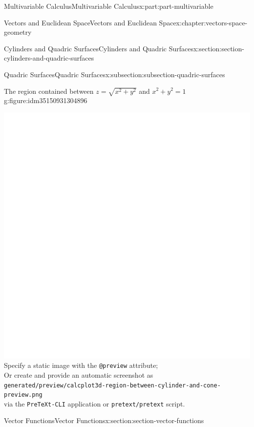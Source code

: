 \documentclass[twoside,10pt,]{tufte-book}
\newcommand{\mono}[1]{\texttt{#1}}
\numberwithin{equation}{part}
\newlength{\qrsize}
\newlength{\previewwidth}
\begin{document}
\begin{partptx}{Multivariable Calculus}{}{Multivariable Calculus}{}{}{x:part:part-multivariable}
\begin{chapterptx}{Vectors and Euclidean Space}{}{Vectors and Euclidean Space}{}{}{x:chapter:vectors-space-geometry}
\begin{sectionptx}{Cylinders and Quadric Surfaces}{}{Cylinders and Quadric Surfaces}{}{}{x:section:section-cylinders-and-quadric-surfaces}
\begin{subsectionptx}{Quadric Surfaces}{}{Quadric Surfaces}{}{}{x:subsection:subsection-quadric-surfaces}
\begin{figureptx}{The region contained between \(z = \sqrt{x^2+y^2}\) and \(x^2+y^2=1\)}{g:figure:idm35150931304896}{}
\begin{tcbraster}[raster columns=2, raster column skip=1pt, raster halign=center, raster force size=false, raster left skip=0pt, raster right skip=0pt]
\begin{tcolorbox}[previewstyle, width=\previewwidth]
{\includegraphics[width=0.80\linewidth,height=\qrsize,keepaspectratio]{generated/preview/calcplot3d-region-between-cylinder-and-cone-preview.png}}%
{\small{}Specify a static image with the \mono{@preview} attribute;\\%
Or create and provide an automatic screenshot as\\%
\mono{generated/preview/calcplot3d-region-between-cylinder-and-cone-preview.png}\\%
via the \mono{PreTeXt-CLI} application or \mono{pretext/pretext} script.}%
\end{tcolorbox}%
\begin{tcolorbox}[qrstyle]%
{\hypersetup{urlcolor=black}}%
\end{tcolorbox}%
\end{tcbraster}%
\tcblower
\end{figureptx}%
\end{subsectionptx}
\end{sectionptx}
%
%
\typeout{************************************************}
\typeout{************************************************}
%
\begin{sectionptx}{Vector Functions}{}{Vector Functions}{}{}{x:section:section-vector-functions}
\begin{introduction}{}%

\end{introduction}
\end{sectionptx}
\end{chapterptx}
\end{partptx}
\end{document}
